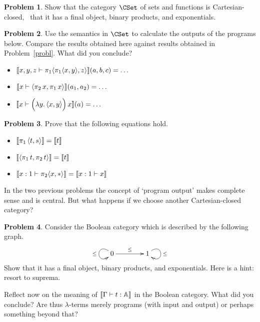 \documentclass[a4paper, 11pt]{article}
\theoremstyle{definition}
\newtheorem{problem}{Problem}
\begin{document}
\begin{problem}
        Show that the category $\CSet$ of sets and functions is
        Cartesian-closed, \ie\ that it has a final object, binary products, and
        exponentials.
\end{problem}
\begin{problem}
        Use the semantics in $\CSet$ to calculate the outputs of the programs
        below. Compare the results obtained here against results obtained in
        Problem~\eqref{probl}. What did you conclude?
        \begin{itemize}
                \item $\llbracket x,y,z \vdash \pi_1 \langle \pi_1 \langle x, y \rangle, z \rangle \rrbracket(a,b,c) = \dots$ 
                \item $\llbracket x \vdash \langle \pi_2 \, x, \pi_1 \, x \rangle \rrbracket(a_1,a_2) = \dots$
                \item $\llbracket x \vdash \Big (\lambda y. \, \langle x, y \rangle \Big ) \, x  \rrbracket (a) = \dots$
        \end{itemize}
\end{problem}

\begin{problem}
        Prove that the following equations hold.
        \begin{itemize}
                \item  $\llbracket \pi_1 \, \langle t, s \rangle \rrbracket = \llbracket t \rrbracket$
                \item $\llbracket \langle \pi_1 \, t, \pi_2 \, t \rangle \rrbracket = \llbracket t \rrbracket$
                \item $\llbracket x : 1 \vdash \pi_2 \langle x, \ast \rangle  \rrbracket = \llbracket x : 1 \vdash x \rrbracket$
        \end{itemize}
\end{problem}

In the two previous problems the concept of `program output' makes complete
sense and is central. But what happens if we choose another Cartesian-closed
category?

\begin{problem}
        Consider the Boolean category which is described by the following graph.
        \[
                \xymatrix@C=40pt{
                        0 \ar[r]^{\leq} \ar@(ul,dl)[]_{\leq} & 1 \ar@(ur,dr)[]^{\leq} 
                }
        \]
        Show that it has a final object, binary products, and exponentials.
        Here is a hint: resort to suprema.
\end{problem}

Reflect now on the meaning of $\llbracket \Gamma \vdash t : \mathbb{A} \rrbracket$ in the Boolean
category. What did you conclude? Are thus $\lambda$-terms merely programs (with
input and output) or perhaps something beyond that?
\end{document}
